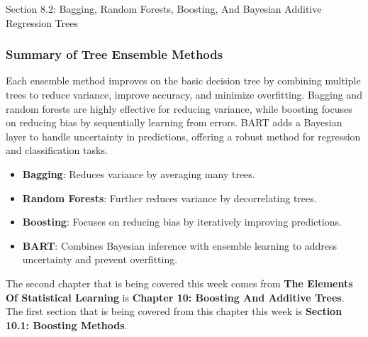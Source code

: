 \begin{notes}{Section 8.2: Bagging, Random Forests, Boosting, And Bayesian Additive Regression Trees}
    \subsubsection*{Summary of Tree Ensemble Methods}
    
    Each ensemble method improves on the basic decision tree by combining multiple trees to reduce variance, improve accuracy, and minimize overfitting. Bagging and random forests are highly effective 
    for reducing variance, while boosting focuses on reducing bias by sequentially learning from errors. BART adds a Bayesian layer to handle uncertainty in predictions, offering a robust method for 
    regression and classification tasks.
    
    \begin{highlight}
        \begin{itemize}
            \item \textbf{Bagging}: Reduces variance by averaging many trees.
            \item \textbf{Random Forests}: Further reduces variance by decorrelating trees.
            \item \textbf{Boosting}: Focuses on reducing bias by iteratively improving predictions.
            \item \textbf{BART}: Combines Bayesian inference with ensemble learning to address uncertainty and prevent overfitting.
        \end{itemize}
    \end{highlight}
\end{notes}

The second chapter that is being covered this week comes from \textbf{The Elements Of Statistical Learning} is \textbf{Chapter 10: Boosting And Additive Trees}. The first section that is being covered
from this chapter this week is \textbf{Section 10.1: Boosting Methods}.

